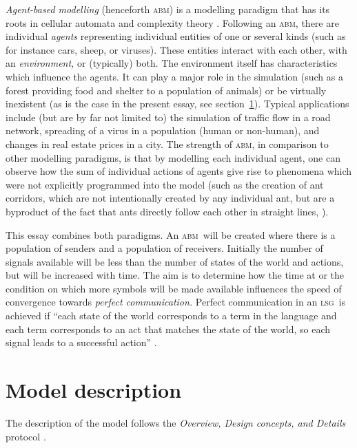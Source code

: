 \documentclass[DIV=calc,BCOR=0mm,pagesize]{scrartcl}
\newcommand{\abm}{\textsc{abm}}
\newcommand{\lsg}{\textsc{lsg}}
\newcommand{\odd}{\textsc{odd}}
\begin{document}
\emph{Agent-based modelling} (henceforth \abm) is a modelling paradigm that has its roots in cellular automata and complexity theory \citep{heath_some_2014}.
Following \citet{grimm_individual_2005,railsback_agent_2011} an \abm, there are individual \emph{agents} representing individual entities of one or several kinds (such as for instance cars, sheep, or viruses).
These entities interact with each other, with an \emph{environment,} or (typically) both.
The environment itself has characteristics which influence the agents.
It can play a major role in the simulation (such as a forest providing food and shelter to a population of animals) or be virtually inexistent (as is the case in the present essay, see section~\ref{sec:mod}).
Typical applications include (but are by far not limited to) the simulation of traffic flow in a road network, spreading of a virus in a population (human or non-human), and changes in real estate prices in a city.
The strength of \abm, in comparison to other modelling paradigms, is that  by modelling each individual agent, one can observe how the sum of individual actions of agents give rise to phenomena which were not explicitly programmed into the model (such as the creation of ant corridors, which are not intentionally created by any individual ant, but are a byproduct of the fact that ants directly follow each other in straight lines, \citet{wilensky_netlogo_1997}).

This essay combines both paradigms.
An \abm\ will be created where there is a population of senders and a population of receivers.
Initially the number of signals available will be less than the number of states of the world and actions, but will be increased with time.
The aim is to determine how the time at or the condition on which more symbols will be made available influences the speed of convergence towards \emph{perfect communication.}
Perfect communication in an \lsg\ is achieved if ``each state of the world corresponds to a term in the language and each term corresponds to an act that matches the state of the world, so each signal leads to a successful action'' \citep[p.~530, there referred to as ``perfect Lewis signalling system'']{barrett_dynamic_2007}.


\section{Model description}
\label{sec:mod}
The description of the model follows the \emph{Overview, Design concepts, and Details} protocol \citep[][henceforth \odd]{grimm_standard_2006, grimm_odd_2010}.
\end{document}
